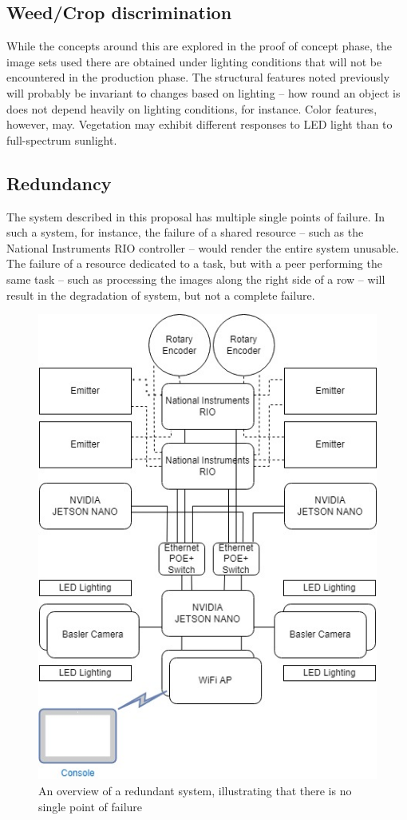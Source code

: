 \documentclass[letterpaper]{article}
\begin{document}
{{\subsection{Weed/Crop discrimination}
While the concepts around this are explored in the proof of concept phase, the image sets used there are obtained under lighting conditions that will  not be encountered in the production phase. The structural features noted previously will probably be invariant to changes based on lighting -- how round an object is does not depend heavily on lighting conditions, for instance. Color features, however, may. Vegetation may exhibit different responses to LED light than to full-spectrum sunlight.

\subsection{Redundancy}
The system described in this proposal has multiple single points of failure. In such a system, for instance, the failure of a shared resource -- such as the National Instruments RIO controller -- would render the entire system unusable. The failure of a resource dedicated to a task, but with a peer performing the same task -- such as processing the images along the right side of a row -- will result in the degradation of system, but not a complete failure.
\begin{figure}[H]
	\centering
	\includegraphics[width=0.4\linewidth]{./figures/system-overview-Page-2.jpg}
	\caption[An overview of a redundant system]{An overview of a redundant system, illustrating that there is no single point of failure}
	\label{fig:system-overview-redundant}
\end{figure}

}}
\end{document}
